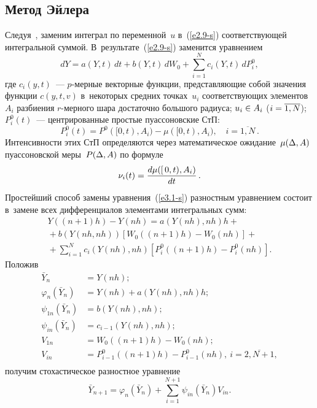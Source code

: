 \begin{multicols}{2}
\section{Метод Эйлера}

Следуя~\cite{11-s, 12-s}, заменим интеграл по переменной~$u$ в~(\ref{e2.9-s})
соответствующей интегральной суммой. В~результате~(\ref{e2.9-s})
заменится уравнением
\begin{equation}
dY=a(Y,t)\,dt+b(Y,t)\,dW_0+\!\sum\limits_{i=1}^N c_i(Y,t)\,dP^0_i,\label{e3.1-s}
\end{equation}
где $c_i(y,t)$~--- $p$-мер\-ные векторные функции, представляющие собой
значения функции $c(y,t,v)$ в~некоторых средних точках~$u_i$
соответствующих элементов~$A_i$ разбиения $r$-мер\-но\-го шара достаточно
большого радиуса; $u_i\hm\in A_i$ ($i\hm=\overline{1,N}$); $P^0_i(t)$~---
центрированные простые пуассоновские СтП:
    \begin{equation*}
    P^0_i(t)=P^0([0,t),A_i)-\mu([0,t),A_i),\quad i=\overline{1,N}\,.
    \end{equation*}
Интенсивности этих СтП определяются через математическое
ожидание~$\mu(\Delta,A)$  пуассоновской меры~$P(\Delta,A)$ по формуле
\begin{equation*}
\nu_i(t)=\displaystyle\frac{\displaystyle d\mu([\,0,t),A_i)\mathstrut}{\displaystyle dt\mathstrut}\,.
\end{equation*}
Простейший способ замены уравнения~(\ref{e3.1-s}) разностным уравнением состоит в~замене всех дифференциалов
элементами интегральных сумм:
\begin{multline*}
Y((n+1)h)-Y(nh)=a(Y(nh),nh)h+{}\\
{}+
b(Y(nh,nh)) \left[W_0((n+1)h)- W_0(nh)\right]+{}\\
{}+\sum\limits_{i=1}^N c_i(Y(nh),nh)\left[ P_i^0((n+1)h)-P_i^0(nh) \right].
    \end{multline*}
Положив
\begin{align*}
    \bar Y_n&=Y(nh);\\
     \varphi_n(\bar Y_n)&=Y(nh)+a(Y(nh),nh)h; \\
  \psi_{1n}(\bar Y_n)&=b(Y(nh),nh);\\
    \psi_{in}(\bar    Y_n)&=c_{i-1}(Y(nh),nh);\\
     V_{1n}&=W_0((n+1)h)-W_0(nh);\\
    V_{in}&=P_{i-1}^0((n+1)h)-P_{i-1}^0(nh),\  i=\overline{2,N+1}, \\[-20pt]
    \end{align*}
получим стохастическое разностное уравнение
    $$
    \bar Y_{n+1}=\varphi_n(\bar Y_n)+\sum\limits_{i=1}^{N+1}\psi_{{in}}(\bar Y_n)V_{in}.
$$


\end{multicols}
